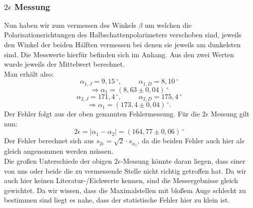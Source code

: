 ~\\
\subsubsection*{$2 \epsilon$ Messung}
Nun haben wir zum vermessen des Winkels $\beta$ um welchen die Polarisationsrichtungen des Halbschattenpolarimeters verschoben sind, jeweils den Winkel der beiden Hälften vermessen bei denen sie jeweils am dunkelsten sind. Die Messwerte hierfür befinden sich im Anhang. Aus den zwei Werten wurde jeweils der Mittelwert berechnet.\\
Man erhält also:\\
\[ \alpha_{1,J}=9,15\,^{\circ} ,~~~~~~~~~~~ \alpha_{1,D}=8,10\,^{\circ} \]
\[ \Rightarrow \alpha_1 = (8,63\pm0,04)\,^{\circ} \]
\[ \alpha_{2,J}=171,4\,^{\circ} ,~~~~~~~~~~~ \alpha_{2,D}=175,4\,^{\circ} \]
\[ \Rightarrow \alpha_1 = (173,4\pm0,04)\,^{\circ} .\]
Der Fehler folgt aus der oben genannten Fehlermessung.
Für die $2\epsilon$ Messung gilt nun:
\[ 2\epsilon = \mid \alpha_1 - \alpha_2 \mid = (164,77\pm0,06)\,^{\circ} \]
Der Fehler berechnet sich aus $s_{2\epsilon}=\sqrt{2} \cdot s_{\alpha_1}$, da die beiden Fehler auch hier als gleich angenommen werden müssen.\\
Die großen Unterschiede der obigen $2\epsilon$-Messung könnte daran liegen, dass einer von uns oder beide die zu vermessende Stelle nicht richtig getroffen hat. Da wir auch hier keinen Literatur-/Eichwerte kennen, sind die Messergebnisse gleich gewichtet. Da wir wissen, dass die Maximalstellen mit bloßem Auge schlecht zu bestimmen sind liegt es nahe, dass der statistische Fehler hier zu klein ist.